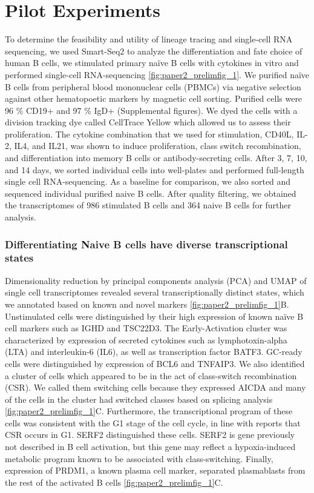 \section{Pilot Experiments}

To determine the feasibility and utility of lineage tracing and single-cell RNA sequencing, we used Smart-Seq2 to analyze the differentiation and fate choice of human B cells, we stimulated primary naïve B cells with cytokines in vitro and performed single-cell RNA-sequencing \ref{fig:paper2_prelimfig_1}. We purified naïve B cells from peripheral blood mononuclear cells (PBMCs) via negative selection against other hematopoetic markers by magnetic cell sorting. Purified cells were 96 \% CD19+ and 97 \% IgD+ (Supplemental figures). We dyed the cells with a division tracking dye called CellTrace Yellow which allowed us to assess their proliferation. The cytokine combination that we used for stimulation, CD40L, IL-2, IL4, and IL21, was shown to induce proliferation, class switch recombination, and differentiation into memory B cells or antibody-secreting cells\cite{konforte_il-21_2009}. After 3, 7, 10, and 14 days, we sorted individual cells into well-plates and performed full-length single cell RNA-sequencing. As a baseline for comparison, we also sorted and sequenced individual purified naive B cells. After quality filtering, we obtained the transcriptomes of 986 stimulated B cells and 364 naive B cells for further analysis.

\subsubsection{Differentiating Naive B cells have diverse transcriptional states}

Dimensionality reduction by principal components analysis (PCA) and UMAP\cite{mcinnes_umap_2018} of single cell transcriptomes revealed several transcriptionally distinct states, which we annotated based on known and novel markers \ref{fig:paper2_prelimfig_1}B. Unstimulated cells were distinguished by their high expression of known naïve B cell markers such as IGHD and TSC22D3. The Early-Activation cluster was characterized by expression of secreted cytokines such as lymphotoxin-alpha (LTA) and interleukin-6 (IL6), as well as transcription factor BATF3. GC-ready cells were distinguished by expression of BCL6 and TNFAIP3. We also identified a cluster of cells which appeared to be in the act of class-switch recombination (CSR). We called them switching cells because they expressed AICDA and many of the cells in the cluster had switched classes based on splicing analysis \ref{fig:paper2_prelimfig_1}C. Furthermore, the transcriptional program of these cells was consistent with the G1 stage of the cell cycle, in line with reports that CSR occurs in G1\cite{abbott2016germinal}. SERF2 distinguished these cells. SERF2 is gene previously not described in B cell activation, but this gene may reflect a hypoxia-induced metabolic program known to be associated with class-switching\cite{abbott2016germinal}. Finally, expression of PRDM1, a known plasma cell marker, separated plasmablasts from the rest of the activated B cells \ref{fig:paper2_prelimfig_1}C.

